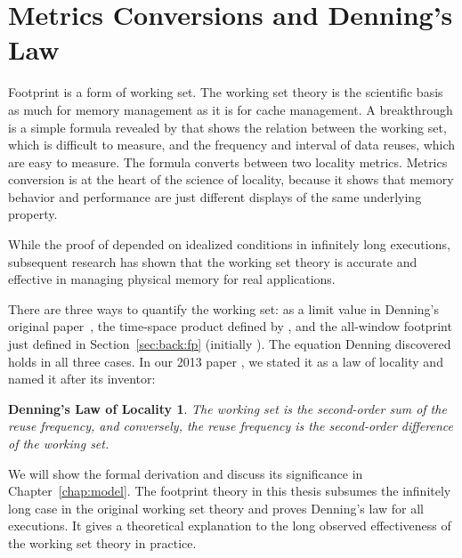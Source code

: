 \section{Metrics Conversions and Denning's Law}

Footprint is a form of working set.  The working set theory is the
scientific basis as much for memory management as it is for cache
management.  A breakthrough is a simple formula revealed by
\citet{DenningS:CACM72} that shows the relation between the
working set, which is difficult to measure, and the frequency and
interval of data reuses, which are easy to measure.  The formula
converts between two locality metrics.  Metrics conversion is at
the heart of the science of locality, because it shows that memory
behavior and performance are just different displays of the same
underlying property.

While the proof of \citet{DenningS:CACM72} depended on idealized
conditions in infinitely long executions, subsequent research has
shown that the working set theory is accurate and effective in
managing physical memory for real applications.


There are three ways to quantify the working set: as a limit
value in Denning's original paper~\citeyear{Denning:CACM68}, the time-space product
defined by \cite{DenningS:CACM78}, and the all-window footprint just
defined in Section~\ref{sec:back:fp} (initially \cite{DingC:PPOPP08}).  The
equation Denning discovered holds in all three cases.  In our 2013
paper \citep{Xiang+:ASPLOS13}, we stated it as a law of locality and named it after its
inventor: 

\newtheorem*{law}{Denning's Law of Locality}

\begin{law}
  The working set is the second-order sum of the reuse frequency, and
  conversely, the reuse frequency is the second-order difference of
  the working set.
\end{law}

We will show the formal derivation and discuss its significance in
Chapter~\ref{chap:model}.  The footprint theory in this thesis
subsumes the infinitely long case in the original working set theory
and proves Denning's law for all executions.  It gives a
theoretical explanation to the long observed effectiveness of the
working set theory in practice.

